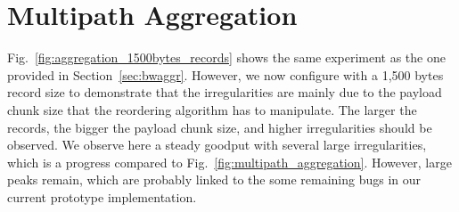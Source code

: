 %

\section{Multipath Aggregation}
\label{appendix:aggr}

Fig.~\ref{fig:aggregation_1500bytes_records} shows the same experiment as
the one provided in Section~\ref{sec:bwaggr}. However, we now configure
\tcpls with a 1,500 bytes record size to demonstrate that the
irregularities are mainly due to the payload chunk size that the reordering
algorithm has to manipulate. The larger the records, the bigger
the payload chunk size, and higher irregularities should be observed. We
observe here a steady goodput with several large irregularities, which is a
progress compared to Fig.~\ref{fig:multipath_aggregation}. However, large
peaks remain, which are probably linked to the some remaining bugs in our current \tcpls
prototype implementation.

